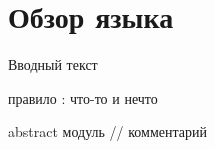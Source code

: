 \hypertarget{review}{%
\section{Обзор языка}\label{обзор:обзор}}


Вводный текст

\begin{grammar}
правило
    : что-то и нечто
\end{grammar}

\begin{source}
abstract модуль // комментарий
\end{source}